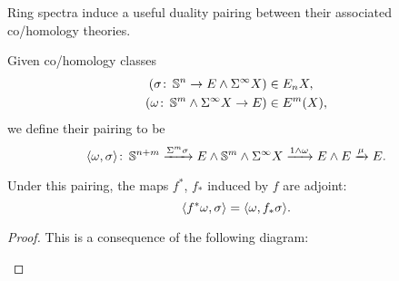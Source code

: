 Ring spectra induce a useful duality pairing between their associated co/homology theories.
\begin{definition}
Given co/homology classes
\begin{align*}
(\sigma\colon\thinspace \mathbb S^n \to E \wedge \Sigma^\infty X) & \in E_n X, \\
(\omega \colon\thinspace \mathbb S^m \wedge \Sigma^\infty X \to E) & \in E^m(X),
\end{align*}
we define their pairing to be \[\langle\omega, \sigma\rangle\colon\thinspace \mathbb S^{n+m} \xrightarrow{\Sigma^m \sigma} E \wedge \mathbb S^m \wedge \Sigma^\infty X \xrightarrow{1 \wedge \omega} E \wedge E \xrightarrow\mu E.\]
\end{definition}

\begin{lemma}
Under this pairing, the maps $f^*$, $f_*$ induced by $f$ are adjoint: \[\langle f^* \omega, \sigma\rangle = \langle\omega, f_* \sigma\rangle.\]
\end{lemma}
\begin{proof}
This is a consequence of the following diagram:
\begin{center}
\end{center}
\end{proof}
